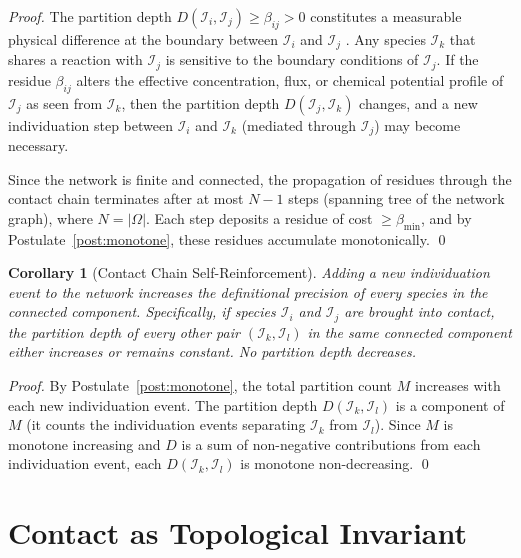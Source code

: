 \documentclass[11pt,twocolumn]{article}
\theoremstyle{plain}
\newtheorem{corollary}[theorem]{Corollary}
\theoremstyle{definition}
\newcommand{\betamin}{\beta_{\min}}
\begin{document}
\begin{proof}
The partition depth $D(\mathcal{I}_i, \mathcal{I}_j) \geq \beta_{ij} > 0$
constitutes a measurable physical difference at the boundary between
$\mathcal{I}_i$ and $\mathcal{I}_j$ \cite{atkins2014physical}. Any species
$\mathcal{I}_k$ that shares a reaction with $\mathcal{I}_j$ is sensitive to the
boundary conditions of $\mathcal{I}_j$. If the residue $\beta_{ij}$ alters the
effective concentration, flux, or chemical potential profile of $\mathcal{I}_j$
as seen from $\mathcal{I}_k$, then the partition depth $D(\mathcal{I}_j,
\mathcal{I}_k)$ changes, and a new individuation step between $\mathcal{I}_i$
and $\mathcal{I}_k$ (mediated through $\mathcal{I}_j$) may become necessary.

Since the network is finite and connected, the propagation of residues through
the contact chain terminates after at most $N-1$ steps (spanning tree of the
network graph), where $N = |\Omega|$. Each step deposits a residue of cost
$\geq \betamin$, and by Postulate~\ref{post:monotone}, these residues accumulate
monotonically. \qed
\end{proof}

\begin{corollary}[Contact Chain Self-Reinforcement]
\label{cor:self_reinforce}
Adding a new individuation event to the network increases the definitional
precision of every species in the connected component. Specifically, if species
$\mathcal{I}_i$ and $\mathcal{I}_j$ are brought into contact, the partition
depth of every other pair $(\mathcal{I}_k, \mathcal{I}_l)$ in the same
connected component either increases or remains constant. No partition depth
decreases.
\end{corollary}

\begin{proof}
By Postulate~\ref{post:monotone}, the total partition count $M$ increases with
each new individuation event. The partition depth $D(\mathcal{I}_k,
\mathcal{I}_l)$ is a component of $M$ (it counts the individuation events
separating $\mathcal{I}_k$ from $\mathcal{I}_l$). Since $M$ is monotone
increasing and $D$ is a sum of non-negative contributions from each
individuation event, each $D(\mathcal{I}_k, \mathcal{I}_l)$ is monotone
non-decreasing. \qed
\end{proof}


\section{Contact as Topological Invariant}
\label{sec:contact}
\end{document}
